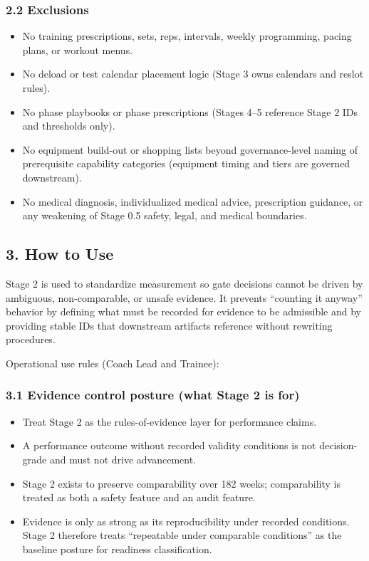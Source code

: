 \documentclass[10pt]{article}
\begin{document}
\subsubsection*{2.2 Exclusions}

\begin{itemize}
\item No training prescriptions, sets, reps, intervals, weekly programming, pacing plans, or workout menus.
\item No deload or test calendar placement logic (Stage 3 owns calendars and reslot rules).
\item No phase playbooks or phase prescriptions (Stages 4–5 reference Stage 2 IDs and thresholds only).
\item No equipment build-out or shopping lists beyond governance-level naming of prerequisite capability categories (equipment timing and tiers are governed downstream).
\item No medical diagnosis, individualized medical advice, prescription guidance, or any weakening of Stage 0.5 safety, legal, and medical boundaries.
\end{itemize}

\subsection*{3. How to Use}

Stage 2 is used to standardize measurement so gate decisions cannot be driven by ambiguous, non-comparable, or unsafe evidence. It prevents “counting it anyway” behavior by defining what must be recorded for evidence to be admissible and by providing stable IDs that downstream artifacts reference without rewriting procedures.

Operational use rules (Coach Lead and Trainee):

\subsubsection*{3.1 Evidence control posture (what Stage 2 is for)}

\begin{itemize}
\item Treat Stage 2 as the rules-of-evidence layer for performance claims.
\item A performance outcome without recorded validity conditions is not decision-grade and must not drive advancement.
\item Stage 2 exists to preserve comparability over 182 weeks; comparability is treated as both a safety feature and an audit feature.
\item Evidence is only as strong as its reproducibility under recorded conditions. Stage 2 therefore treats “repeatable under comparable conditions” as the baseline posture for readiness classification.
\end{itemize}
\end{document}
